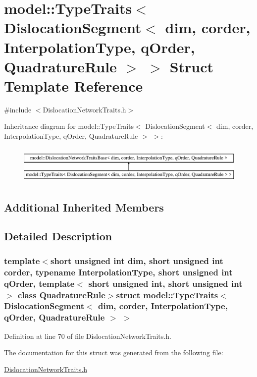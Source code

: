 \hypertarget{structmodel_1_1_type_traits_3_01_dislocation_segment_3_01dim_00_01corder_00_01_interpolation_typ757fc2f31a35d5fc1b07a4a1fd7c8dd4}{}\section{model\+:\+:Type\+Traits$<$ Dislocation\+Segment$<$ dim, corder, Interpolation\+Type, q\+Order, Quadrature\+Rule $>$ $>$ Struct Template Reference}
\label{structmodel_1_1_type_traits_3_01_dislocation_segment_3_01dim_00_01corder_00_01_interpolation_typ757fc2f31a35d5fc1b07a4a1fd7c8dd4}


{\ttfamily \#include $<$Dislocation\+Network\+Traits.\+h$>$}

Inheritance diagram for model\+:\+:Type\+Traits$<$ Dislocation\+Segment$<$ dim, corder, Interpolation\+Type, q\+Order, Quadrature\+Rule $>$ $>$\+:\begin{figure}[H]
\begin{center}
\leavevmode
\includegraphics[height=1.879195cm]{structmodel_1_1_type_traits_3_01_dislocation_segment_3_01dim_00_01corder_00_01_interpolation_typ757fc2f31a35d5fc1b07a4a1fd7c8dd4}
\end{center}
\end{figure}
\subsection*{Additional Inherited Members}


\subsection{Detailed Description}
\subsubsection*{template$<$short unsigned int dim, short unsigned int corder, typename Interpolation\+Type, short unsigned int q\+Order, template$<$ short unsigned int, short unsigned int $>$ class Quadrature\+Rule$>$struct model\+::\+Type\+Traits$<$ Dislocation\+Segment$<$ dim, corder, Interpolation\+Type, q\+Order, Quadrature\+Rule $>$ $>$}



Definition at line 70 of file Dislocation\+Network\+Traits.\+h.



The documentation for this struct was generated from the following file\+:\begin{DoxyCompactItemize}
\item 
\hyperlink{_dislocation_network_traits_8h}{Dislocation\+Network\+Traits.\+h}\end{DoxyCompactItemize}

